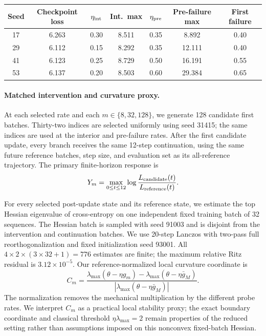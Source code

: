 \documentclass[11pt]{article}
\begin{document}
\begin{center}
\small
\begin{tabular}{@{}ccccccc@{}}
\toprule
Seed&Checkpoint loss&\(\eta_{\rm int}\)&Int.\ max&
\(\eta_{\rm pre}\)&Pre-failure max&First failure\\
\midrule
17&6.263&0.30&8.511&0.35&8.892&0.40\\
29&6.112&0.15&8.292&0.35&12.111&0.40\\
41&6.123&0.25&8.729&0.50&16.191&0.55\\
53&6.137&0.20&8.503&0.60&29.384&0.65\\
\bottomrule
\end{tabular}
\end{center}

\paragraph{Matched intervention and curvature proxy.}
At each selected rate and each
\(m\in\{8,32,128\}\), we generate 128 candidate first batches.  Thirty-two
indices are selected uniformly using seed 31415; the same indices are used
at the interior and pre-failure rates.  After the first candidate update,
every branch receives the same 12-step continuation, using the same future
reference batches, step size, and evaluation set as its all-reference
trajectory.  The primary finite-horizon response is
\[
  Y_m=\max_{0\le t\le12}
  \log\frac{L_{\rm candidate}(t)}{L_{\rm reference}(t)}.
\]

For every selected post-update state and its reference state, we estimate
the top Hessian eigenvalue of cross-entropy on one independent fixed training
batch of 32 sequences.  The Hessian batch is sampled with seed 91003 and is
disjoint from the intervention and continuation batches.  We use 20-step
Lanczos with two-pass full reorthogonalization and fixed initialization seed
93001.  All \(4\times2\times(3\times32+1)=776\) estimates are finite; the
maximum relative Ritz residual is \(3.12\times10^{-5}\).  Our
reference-normalized local curvature coordinate is
\[
  C_m=
  \frac{\lambda_{\max}(\theta-\eta g_m)
       -\lambda_{\max}(\theta-\eta\bar g_M)}
       {|\lambda_{\max}(\theta-\eta\bar g_M)|}.
\]
The normalization removes the mechanical multiplication by the different
probe rates.  We interpret \(C_m\) as a practical local stability proxy; the
exact boundary coordinate and classical threshold
\(\eta\lambda_{\max}=2\) remain properties of the reduced setting rather
than assumptions imposed on this nonconvex fixed-batch Hessian.
\end{document}
